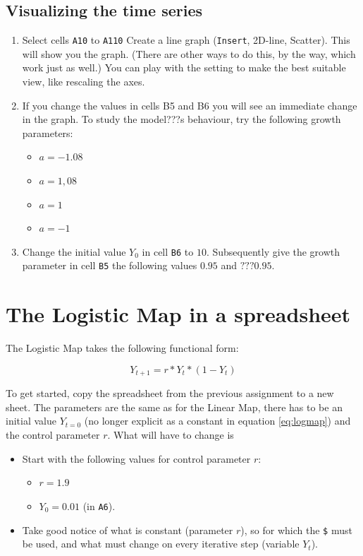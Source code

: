 \documentclass[]{book}
\providecommand{\tightlist}{%
  \setlength{\itemsep}{0pt}\setlength{\parskip}{0pt}}
\let\stdsection\section
\renewcommand\section{\newpage\stdsection}
\begin{document}
\subsection{Visualizing the time
series}\label{visualizing-the-time-series}

\begin{enumerate}
\item
  Select cells \texttt{A10} to \texttt{A110} Create a line graph
  (\texttt{Insert}, 2D-line, Scatter). This will show you the graph.
  (There are other ways to do this, by the way, which work just as
  well.) You can play with the setting to make the best suitable view,
  like rescaling the axes.
\item
  If you change the values in cells B5 and B6 you will see an immediate
  change in the graph. To study the model???s behaviour, try the
  following growth parameters:

  \begin{itemize}
  \tightlist
  \item
    \(a = -1.08\)
  \item
    \(a = 1,08\)
  \item
    \(a = 1\)
  \item
    \(a = -1\)
  \end{itemize}
\item
  Change the initial value \(Y_0\) in cell \texttt{B6} to \(10\).
  Subsequently give the growth parameter in cell \texttt{B5} the
  following values \(0.95\) and \(???0.95\).
\end{enumerate}

\section{The Logistic Map in a
spreadsheet}\label{the-logistic-map-in-a-spreadsheet}

The Logistic Map takes the following functional form:

\begin{equation}
Y_{t+1} = r*Y_t*(1-Y_t)
\label{eq:logmap}
\end{equation}

To get started, copy the spreadsheet from the previous assignment to a
new sheet. The parameters are the same as for the Linear Map, there has
to be an initial value \(Y_{t=0}\) (no longer explicit as a constant in
equation \eqref{eq:logmap}) and the control parameter \(r\). What will
have to change is

\begin{itemize}
\tightlist
\item
  Start with the following values for control parameter \(r\):

  \begin{itemize}
  \tightlist
  \item
    \(r = 1.9\)
  \item
    \(Y_0 = 0.01\) (in \texttt{A6}).
  \end{itemize}
\item
  Take good notice of what is constant (parameter \(r\)), so for which
  the \texttt{\$} must be used, and what must change on every iterative
  step (variable \(Y_t\)).
\end{itemize}
\end{document}
